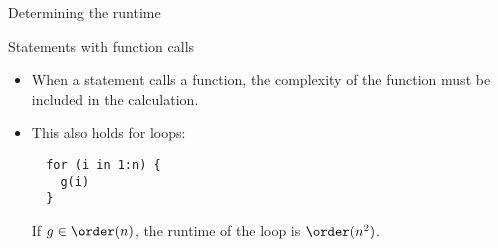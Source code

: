 \documentclass[11pt,compress,t,notes=noshow, xcolor=table]{beamer}
\begin{document}
\begin{vbframe}{Determining the runtime}
\framebreak

\begin{block}{Statements with function calls}
\begin{itemize}
  \item When a statement calls a function, the complexity of the function must be included in the calculation.
  \item This also holds for loops:\\
  \begin{verbatim}
  for (i in 1:n) {
    g(i)
  }
  \end{verbatim}
  If $g \in \order(n)$, the runtime of the loop is $\order(n^2)$.
\end{itemize}

\end{block}

\end{vbframe}
\end{document}
